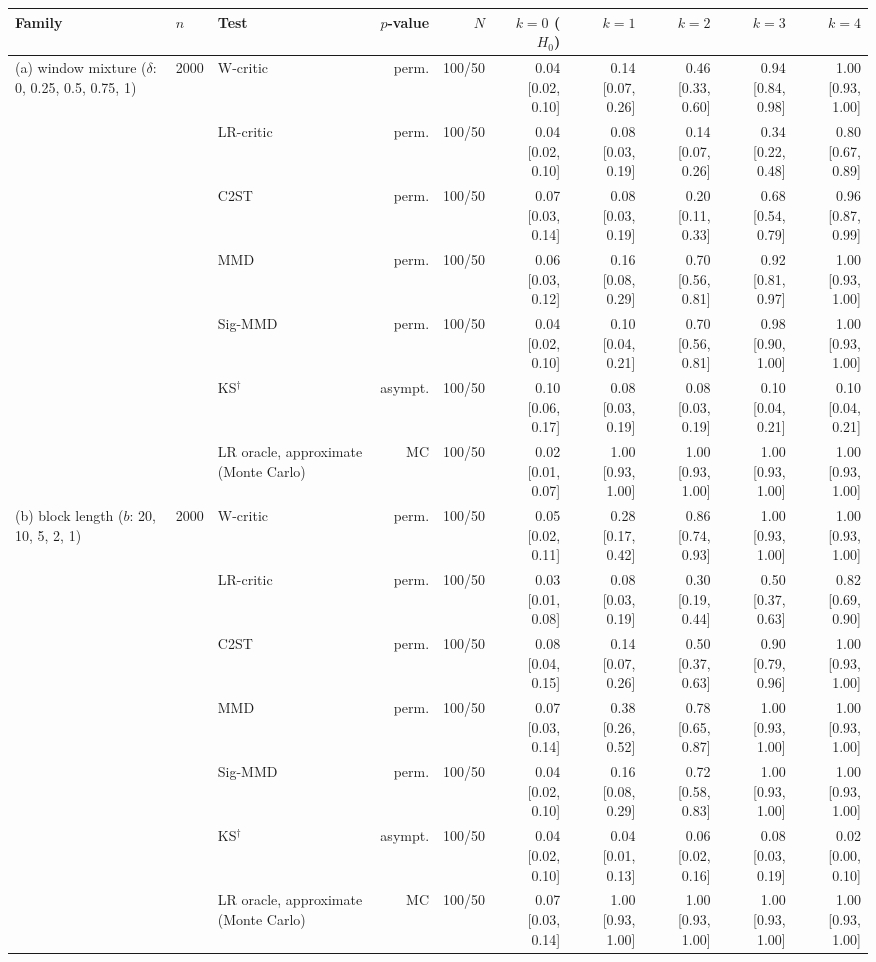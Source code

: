 \begin{tabular}{lllrrrrrrr}
\toprule
Family & $n$ & Test & $p$-value & $N$ & $k=0$ ($H_0$) & $k=1$ & $k=2$ & $k=3$ & $k=4$ \\
\midrule
(a) window mixture ($\delta$: 0, 0.25, 0.5, 0.75, 1) & 2000 & W-critic & perm. & 100/50 & 0.04 [0.02, 0.10] & 0.14 [0.07, 0.26] & 0.46 [0.33, 0.60] & 0.94 [0.84, 0.98] & 1.00 [0.93, 1.00] \\
 &  & LR-critic & perm. & 100/50 & 0.04 [0.02, 0.10] & 0.08 [0.03, 0.19] & 0.14 [0.07, 0.26] & 0.34 [0.22, 0.48] & 0.80 [0.67, 0.89] \\
 &  & C2ST & perm. & 100/50 & 0.07 [0.03, 0.14] & 0.08 [0.03, 0.19] & 0.20 [0.11, 0.33] & 0.68 [0.54, 0.79] & 0.96 [0.87, 0.99] \\
 &  & MMD & perm. & 100/50 & 0.06 [0.03, 0.12] & 0.16 [0.08, 0.29] & 0.70 [0.56, 0.81] & 0.92 [0.81, 0.97] & 1.00 [0.93, 1.00] \\
 &  & Sig-MMD & perm. & 100/50 & 0.04 [0.02, 0.10] & 0.10 [0.04, 0.21] & 0.70 [0.56, 0.81] & 0.98 [0.90, 1.00] & 1.00 [0.93, 1.00] \\
 &  & KS$^{\dagger}$ & asympt. & 100/50 & 0.10 [0.06, 0.17] & 0.08 [0.03, 0.19] & 0.08 [0.03, 0.19] & 0.10 [0.04, 0.21] & 0.10 [0.04, 0.21] \\
 &  & LR oracle, approximate (Monte Carlo) & MC & 100/50 & 0.02 [0.01, 0.07] & 1.00 [0.93, 1.00] & 1.00 [0.93, 1.00] & 1.00 [0.93, 1.00] & 1.00 [0.93, 1.00] \\
(b) block length ($b$: 20, 10, 5, 2, 1) & 2000 & W-critic & perm. & 100/50 & 0.05 [0.02, 0.11] & 0.28 [0.17, 0.42] & 0.86 [0.74, 0.93] & 1.00 [0.93, 1.00] & 1.00 [0.93, 1.00] \\
 &  & LR-critic & perm. & 100/50 & 0.03 [0.01, 0.08] & 0.08 [0.03, 0.19] & 0.30 [0.19, 0.44] & 0.50 [0.37, 0.63] & 0.82 [0.69, 0.90] \\
 &  & C2ST & perm. & 100/50 & 0.08 [0.04, 0.15] & 0.14 [0.07, 0.26] & 0.50 [0.37, 0.63] & 0.90 [0.79, 0.96] & 1.00 [0.93, 1.00] \\
 &  & MMD & perm. & 100/50 & 0.07 [0.03, 0.14] & 0.38 [0.26, 0.52] & 0.78 [0.65, 0.87] & 1.00 [0.93, 1.00] & 1.00 [0.93, 1.00] \\
 &  & Sig-MMD & perm. & 100/50 & 0.04 [0.02, 0.10] & 0.16 [0.08, 0.29] & 0.72 [0.58, 0.83] & 1.00 [0.93, 1.00] & 1.00 [0.93, 1.00] \\
 &  & KS$^{\dagger}$ & asympt. & 100/50 & 0.04 [0.02, 0.10] & 0.04 [0.01, 0.13] & 0.06 [0.02, 0.16] & 0.08 [0.03, 0.19] & 0.02 [0.00, 0.10] \\
 &  & LR oracle, approximate (Monte Carlo) & MC & 100/50 & 0.07 [0.03, 0.14] & 1.00 [0.93, 1.00] & 1.00 [0.93, 1.00] & 1.00 [0.93, 1.00] & 1.00 [0.93, 1.00] \\
\bottomrule
\end{tabular}
